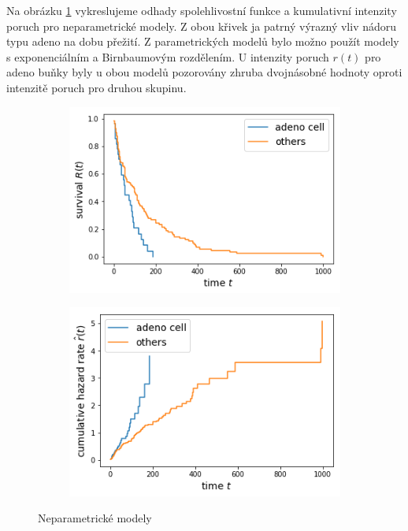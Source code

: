 \documentclass[10pt]{article}
\begin{document}
Na obrázku \ref{fig:adenosdf} vykreslujeme odhady spolehlivostní funkce a kumulativní intenzity poruch pro neparametrické modely. Z obou křivek ja patrný výrazný vliv nádoru typu adeno na dobu přežití. Z parametrických modelů bylo možno použít modely s exponenciálním a Birnbaumovým rozdělením. U intenzity poruch $r(t)$ pro adeno buňky byly u obou modelů pozorovány zhruba dvojnásobné hodnoty oproti intenzitě poruch pro druhou skupinu. 
   
  \begin{figure}[htb!]
\centering
    \begin{subfigure}{.4\linewidth}
    \centering
    \includegraphics[width=.99\textwidth]{Images/kmadeno.png}
  \end{subfigure}%
    \begin{subfigure}{.4\linewidth}
    \centering
    \includegraphics[width=.99\textwidth]{Images/nadeno.png}
  \end{subfigure}%
  \caption{Neparametrické modely}\label{fig:adenosdf} 
   \end{figure}   
   
\end{document}
